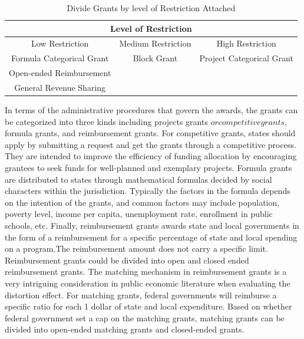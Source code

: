 \begin{table}[H]
  \centering
  \caption{Divide Grants by level of Restriction Attached}
  \begin{tabular}{ccc}
    \toprule
    \multicolumn{3}{c}{Level of Restriction}                                   \\
    \midrule
    Low Restriction           & Medium Restriction & High Restriction          \\
    \midrule
    Formula Categorical Grant & Block Grant        & Project Categorical Grant \\
    Open-ended Reimbursement  &                    &                           \\
    General Revenue Sharing   &                    &                           \\
    \bottomrule
  \end{tabular}%
  \label{Table 1.3}%
\end{table}%


In terms of the administrative procedures that govern the awards, the grants can be categorized into three kinds including projects grants \(or competitive grants\), formula grants, and reimbursement grants. For competitive grants, states should apply by submitting a request and get the grants through a competitive process. They are intended to improve the efficiency of funding allocation by encouraging grantees to seek funds for well-planned and exemplary projects. Formula grants are distributed to states through mathematical formulas decided by social characters within the jurisdiction. Typically the factors in the formula depends on the intention of the grants, and common factors may include population, poverty level, income per capita, unemployment rate, enrollment in public schools, etc. Finally, reimbursement grants awards state and local governments in the form of a reimbursement for a specific percentage of state and local spending on a program.The reimbursement amount does not carry a specific limit. Reimbursement grants could be divided into open and closed ended reimbursement grants. The matching mechanism in reimbursement grants is a very intriguing consideration in public economic literature when evaluating the distortion effect. For matching grants, federal governments will reimburse a specific ratio for each 1 dollar of state and local expenditure. Based on whether federal government set a cap on the matching grants, matching grants can be divided into open-ended matching grants and closed-ended grants.

